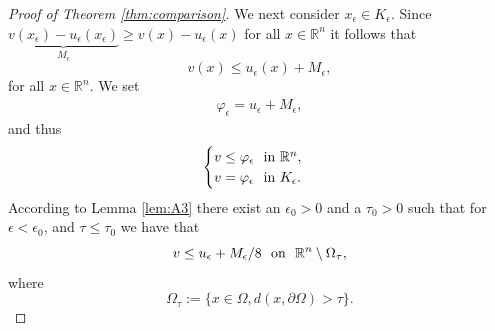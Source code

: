 \documentclass[11pt]{article}
\providecommand{\Rn}{\mathbb{R}^n}
\numberwithin{equation}{section}
\theoremstyle{definition}
\begin{document}
\begin{proof}[Proof of Theorem \ref{thm:comparison}]
We next consider $x_{\epsilon} \in K_{\epsilon}$. Since $\underbrace{v(x_{\epsilon})-u_{\epsilon}(x_{\epsilon})}_{M_{\epsilon}} \geq v(x)-u_{\epsilon}(x)$ for all $x \in \Rn$ it follows that
$$
v(x) \leq u_{\epsilon}(x)+M_{\epsilon},
$$
for all $x \in \Rn$.
We set
\begin{align*}
 \varphi_{\epsilon} =  u_{\epsilon}+M_{\epsilon},
\end{align*}
and thus
\begin{align}
     \begin{cases}
                 v \leq  \varphi_{\epsilon}  \ \textup{ in  } \Rn, \\
                 v = \varphi_{\epsilon} \ \textup{ in  }  K_{\epsilon}.
     \end{cases}
\end{align}
According to Lemma \ref{lem:A3} there exist an $\epsilon_0>0$ and a $\tau_0 >0$ such that for $\epsilon < \epsilon_0$, and $\tau \leq \tau_0$ we have that
\begin{equation}
\label{eq:blahblah}
v \leq u_{\epsilon} + M_{\epsilon}/8 \ \textup{ on } \ \Rn \setminus \Omega_{\tau},   
\end{equation}
where
$$
\Omega_{\tau}:= \{ x \in \Omega, d(x, \partial \Omega)> \tau \}. 
$$

 


\end{proof}
\end{document}
